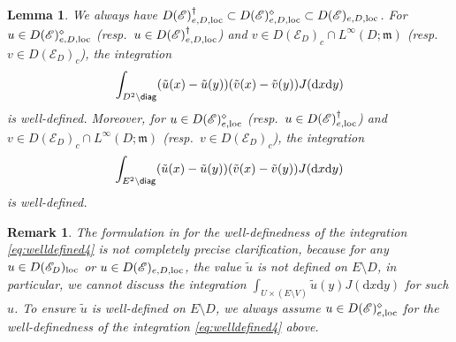 \documentclass[12pt,a4paper]{article}
\newtheorem{lem}[thm]{Lemma}
\newtheorem{remark}[thm]{Remark}
\renewcommand{\d}{\mathrm{d}}
\newcommand{\m}{\mathfrak{m} }
\newcommand{\loc}{{\rm loc}}
\newcommand{\1}{{\bf 1}}
\begin{document}
\begin{lem}\label{lem:weldefinedness}
We always have $D(\mathscr{E})_{e,D,\loc}^{\dag}\subset D(\mathscr{E})_{e,D,\loc}^{\diamond}\subset D(\mathscr{E})_{e,D,\loc}$. 
For $u\in D(\mathscr{E})_{e,D,\loc}^{\diamond}$ 
{\rm(}resp.~$u\in D(\mathscr{E})_{e,D,\loc}^{\dag}${\rm)} and 
$v\in D(\mathscr{E}_D)_c\cap L^{\infty}(D;{\m})$ {\rm(}resp.~$v\in D(\mathscr{E}_D)_c${\rm)}, 
the integration 
\begin{align}
\int_{D^2\setminus {\sf diag}}
(\tilde{u}(x)-\tilde{u}(y))(\tilde{v}(x)-\tilde{v}(y))J({\d} x{\d} y)\label{eq:welldefined3}
\end{align}
is well-defined.
Moreover, 
for $u\in 
D(\mathscr{E})_{e,\loc}^{\diamond}
$ {\rm(}resp.~$u\in 
D(\mathscr{E})_{e,\loc}^{\dag}
${\rm)}
and 
$v\in D(\mathscr{E}_D)_c\cap L^{\infty}(D;{\m})$ {\rm(}resp.~$v\in D(\mathscr{E}_D)_c${\rm)}, the integration 
\begin{align}
\int_{E^2\setminus {\sf diag}}
(\tilde{u}(x)-\tilde{u}(y))(\tilde{v}(x)-\tilde{v}(y))J({\d} x{\d} y)\label{eq:welldefined4}
\end{align}
is well-defined.
\end{lem}
\begin{remark}
{\rm The formulation in \cite{Chen,CK} for the 
well-definedness of the integration \eqref{eq:welldefined4} is 
not completely precise clarification, because for any $u\in D(\mathscr{E}_D)_{\loc}$ or $u\in D(\mathscr{E})_{e,D,\loc}$, the value $\tilde{u}$ is not defined on $E\setminus D$, in particular, we cannot discuss the integration 
$\int_{U\times (E\setminus V)}\tilde{u}(y)J({\d} x{\d} y)$ for such $u$.   
To ensure $\tilde{u}$ is well-defined on $E\setminus D$, we always 
assume $u\in D(\mathscr{E})_{e,\loc}^{\diamond}$ for the 
well-definedness of the integration \eqref{eq:welldefined4} above.
}
\end{remark}
\end{document}
